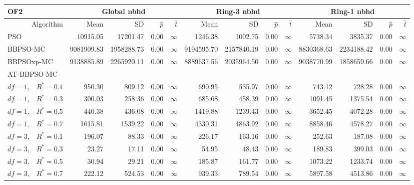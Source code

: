 \documentclass[12pt]{article}
\begin{document}
\begin{table}[ht]
\centering
\tiny{
\begin{tabular}{r|rrrr|rrrr|rrrr}
\multicolumn{1}{l}{OF2} & \multicolumn{4}{c}{Global nbhd} & \multicolumn{4}{c}{Ring-3 nbhd} & \multicolumn{4}{c}{Ring-1 nbhd}\\
  \hline
Algorithm & Mean & SD & $\widehat{p}$ & $\widehat{t}$ & Mean & SD & $\widehat{p}$ & $\widehat{t}$ & Mean & SD & $\widehat{p}$ & $\widehat{t}$ \\
  \hline
\multicolumn{1}{l|}{PSO} & 10915.05 & 17201.47 & 0.00 & $\infty$ & 1246.38 & 1002.75 & 0.00 & $\infty$ & 5738.34 & 3835.37 & 0.00 & $\infty$ \\ 
  \multicolumn{1}{l|}{BBPSO-MC} & 9081909.83 & 1958288.73 & 0.00 & $\infty$ & 9194595.70 & 2157840.19 & 0.00 & $\infty$ & 8830368.63 & 2234188.42 & 0.00 & $\infty$ \\ 
  \multicolumn{1}{l|}{BBPSOxp-MC} & 9138885.89 & 2265920.11 & 0.00 & $\infty$ & 8889637.56 & 2035964.50 & 0.00 & $\infty$ & 9038770.99 & 1858659.66 & 0.00 & $\infty$ \\ 
\hline
\multicolumn{1}{l|}{AT-BBPSO-MC} &&&&&&&&&&&&\\
  $df = 1,\enspace$ $R^* =0.1$ & 950.30 & 809.12 & 0.00 & $\infty$ & 690.95 & 535.97 & 0.00 & $\infty$ & 743.12 & 728.28 & 0.00 & $\infty$ \\ 
  $df = 1,\enspace$ $R^* =0.3$ & 300.03 & 258.36 & 0.00 & $\infty$ & 685.68 & 458.39 & 0.00 & $\infty$ & 1091.45 & 1375.54 & 0.00 & $\infty$ \\ 
  $df = 1,\enspace$ $R^* =0.5$ & 440.38 & 436.08 & 0.00 & $\infty$ & 1419.88 & 1239.43 & 0.00 & $\infty$ & 3652.45 & 4072.28 & 0.00 & $\infty$ \\ 
  $df = 1,\enspace$ $R^* =0.7$ & 1615.81 & 1539.22 & 0.00 & $\infty$ & 4330.31 & 4863.92 & 0.00 & $\infty$ & 8858.46 & 4578.27 & 0.00 & $\infty$ \\ 
  $df = 3,\enspace$ $R^* =0.1$ & 196.07 & 88.33 & 0.00 & $\infty$ & 226.17 & 163.16 & 0.00 & $\infty$ & 252.63 & 187.08 & 0.00 & $\infty$ \\ 
  $df = 3,\enspace$ $R^* =0.3$ & 23.27 & 17.11 & 0.00 & $\infty$ & 54.95 & 48.43 & 0.00 & $\infty$ & 189.83 & 399.03 & 0.00 & $\infty$ \\ 
  $df = 3,\enspace$ $R^* =0.5$ & 30.94 & 29.21 & 0.00 & $\infty$ & 185.87 & 161.77 & 0.00 & $\infty$ & 1073.22 & 1233.74 & 0.00 & $\infty$ \\ 
  $df = 3,\enspace$ $R^* =0.7$ & 222.12 & 524.53 & 0.00 & $\infty$ & 939.33 & 789.54 & 0.00 & $\infty$ & 5897.58 & 4513.86 & 0.00 & $\infty$ \\ 

\end{tabular}}
\end{table}
\end{document}
